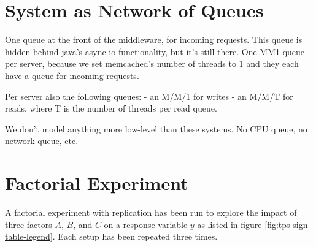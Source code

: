 \documentclass[11pt]{article}
\begin{document}
\section{System as Network of Queues}\label{sec:network-of-queues}



One queue at the front of the middleware, for incoming requests.
This queue is hidden behind java's async io functionality, but it's still there.
One MM1 queue per server, because we set memcached's number of threads to 1 and they each have a queue for incoming requests.

Per server also the following queues:
- an M/M/1 for writes
- an M/M/T for reads, where T is the number of threads per read queue.

We don't model anything more low-level than these systems. No CPU queue, no network queue, etc.


\section{Factorial Experiment}\label{sec:2k-experiment}



A factorial experiment with replication has been run to explore the impact of three factors $A$, $B$, and $C$ on a response variable $y$ as listed in figure \ref{fig:tps-sign-table-legend}.
Each setup has been repeated three times.
\end{document}
